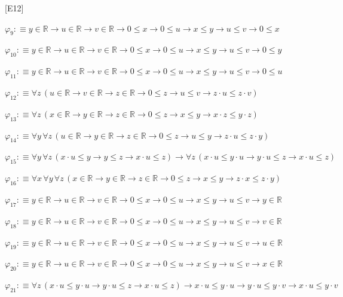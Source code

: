 \begin{fullproof}{[E12]}
\begin{abbrevlist}
\item $\varphi_{9} :\equiv y \in \mathbb{R} \to u \in \mathbb{R} \to v \in \mathbb{R} \to 0 \leq x \to 0 \leq u \to x \leq y \to u \leq v \to 0 \leq x$
\item $\varphi_{10} :\equiv y \in \mathbb{R} \to u \in \mathbb{R} \to v \in \mathbb{R} \to 0 \leq x \to 0 \leq u \to x \leq y \to u \leq v \to 0 \leq y$
\item $\varphi_{11} :\equiv y \in \mathbb{R} \to u \in \mathbb{R} \to v \in \mathbb{R} \to 0 \leq x \to 0 \leq u \to x \leq y \to u \leq v \to 0 \leq u$
\item $\varphi_{12} :\equiv \forall z\,(u \in \mathbb{R} \to v \in \mathbb{R} \to z \in \mathbb{R} \to 0 \leq z \to u \leq v \to z \cdot u \leq z \cdot v)$
\item $\varphi_{13} :\equiv \forall z\,(x \in \mathbb{R} \to y \in \mathbb{R} \to z \in \mathbb{R} \to 0 \leq z \to x \leq y \to x \cdot z \leq y \cdot z)$
\item $\varphi_{14} :\equiv \forall y\,\forall z\,(u \in \mathbb{R} \to y \in \mathbb{R} \to z \in \mathbb{R} \to 0 \leq z \to u \leq y \to z \cdot u \leq z \cdot y)$
\item $\varphi_{15} :\equiv \forall y\,\forall z\,(x \cdot u \leq y \to y \leq z \to x \cdot u \leq z) \to \forall z\,(x \cdot u \leq y \cdot u \to y \cdot u \leq z \to x \cdot u \leq z)$
\item $\varphi_{16} :\equiv \forall x\,\forall y\,\forall z\,(x \in \mathbb{R} \to y \in \mathbb{R} \to z \in \mathbb{R} \to 0 \leq z \to x \leq y \to z \cdot x \leq z \cdot y)$
\item $\varphi_{17} :\equiv y \in \mathbb{R} \to u \in \mathbb{R} \to v \in \mathbb{R} \to 0 \leq x \to 0 \leq u \to x \leq y \to u \leq v \to y \in \mathbb{R}$
\item $\varphi_{18} :\equiv y \in \mathbb{R} \to u \in \mathbb{R} \to v \in \mathbb{R} \to 0 \leq x \to 0 \leq u \to x \leq y \to u \leq v \to v \in \mathbb{R}$
\item $\varphi_{19} :\equiv y \in \mathbb{R} \to u \in \mathbb{R} \to v \in \mathbb{R} \to 0 \leq x \to 0 \leq u \to x \leq y \to u \leq v \to u \in \mathbb{R}$
\item $\varphi_{20} :\equiv y \in \mathbb{R} \to u \in \mathbb{R} \to v \in \mathbb{R} \to 0 \leq x \to 0 \leq u \to x \leq y \to u \leq v \to x \in \mathbb{R}$
\item $\varphi_{21} :\equiv \forall z\,(x \cdot u \leq y \cdot u \to y \cdot u \leq z \to x \cdot u \leq z) \to x \cdot u \leq y \cdot u \to y \cdot u \leq y \cdot v \to x \cdot u \leq y \cdot v$

\end{abbrevlist}
\end{fullproof}
